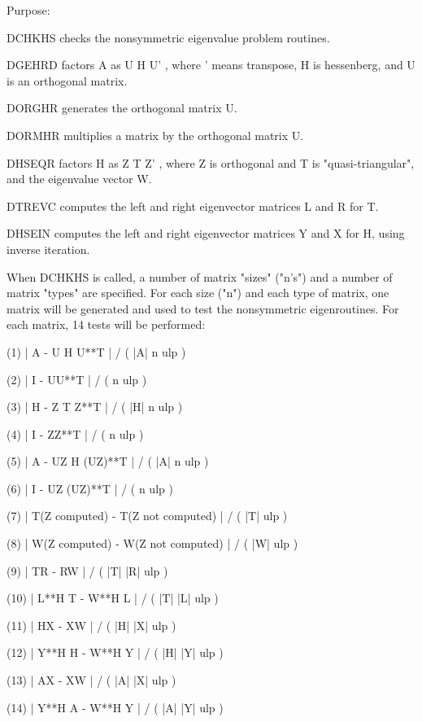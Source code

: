 \begin{DoxyParagraph}{Purpose\+: }
\begin{DoxyVerb}    DCHKHS  checks the nonsymmetric eigenvalue problem routines.

            DGEHRD factors A as  U H U' , where ' means transpose,
            H is hessenberg, and U is an orthogonal matrix.

            DORGHR generates the orthogonal matrix U.

            DORMHR multiplies a matrix by the orthogonal matrix U.

            DHSEQR factors H as  Z T Z' , where Z is orthogonal and
            T is "quasi-triangular", and the eigenvalue vector W.

            DTREVC computes the left and right eigenvector matrices
            L and R for T.

            DHSEIN computes the left and right eigenvector matrices
            Y and X for H, using inverse iteration.

    When DCHKHS is called, a number of matrix "sizes" ("n's") and a
    number of matrix "types" are specified.  For each size ("n")
    and each type of matrix, one matrix will be generated and used
    to test the nonsymmetric eigenroutines.  For each matrix, 14
    tests will be performed:

    (1)     | A - U H U**T | / ( |A| n ulp )

    (2)     | I - UU**T | / ( n ulp )

    (3)     | H - Z T Z**T | / ( |H| n ulp )

    (4)     | I - ZZ**T | / ( n ulp )

    (5)     | A - UZ H (UZ)**T | / ( |A| n ulp )

    (6)     | I - UZ (UZ)**T | / ( n ulp )

    (7)     | T(Z computed) - T(Z not computed) | / ( |T| ulp )

    (8)     | W(Z computed) - W(Z not computed) | / ( |W| ulp )

    (9)     | TR - RW | / ( |T| |R| ulp )

    (10)    | L**H T - W**H L | / ( |T| |L| ulp )

    (11)    | HX - XW | / ( |H| |X| ulp )

    (12)    | Y**H H - W**H Y | / ( |H| |Y| ulp )

    (13)    | AX - XW | / ( |A| |X| ulp )

    (14)    | Y**H A - W**H Y | / ( |A| |Y| ulp )


\end{DoxyVerb}
\end{DoxyParagraph}
